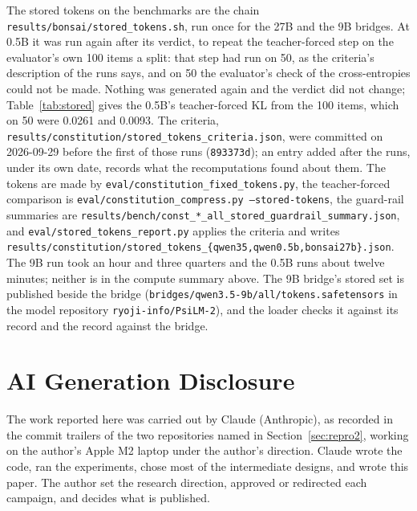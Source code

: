 \documentclass[11pt]{article}
\newcommand{\code}[1]{\texttt{#1}}
\begin{document}
\begin{sloppypar}
The stored tokens on the benchmarks are the chain
\code{results/\allowbreak{}bonsai/\allowbreak{}stored\_\allowbreak{}tokens.sh}, run once for the 27B
and the 9B bridges. At 0.5B it was run again after its verdict, to repeat the
teacher-forced step on the evaluator's own 100 items a split: that step had run on
50, as the criteria's description of the runs says, and on 50 the evaluator's
check of the cross-entropies could not be made. Nothing was generated again and
the verdict did not change; Table~\ref{tab:stored} gives the 0.5B's
teacher-forced KL from the 100 items, which on 50 were 0.0261 and 0.0093. The
criteria, \code{results/\allowbreak{}constitution/\allowbreak{}stored\_\allowbreak{}tokens\_\allowbreak{}criteria.json}, were
committed on 2026-09-29 before the first of those runs (\code{893373d}); an entry
added after the runs, under its own date, records what the recomputations found
about them. The tokens are made by \code{eval/\allowbreak{}constitution\_\allowbreak{}fixed\_\allowbreak{}tokens.py},
the teacher-forced comparison is
\code{eval/\allowbreak{}constitution\_\allowbreak{}compress.py --stored-tokens}, the guard-rail
summaries are \code{results/\allowbreak{}bench/\allowbreak{}const\_*\_all\_\allowbreak{}stored\_\allowbreak{}guardrail\_\allowbreak{}summary.json},
and \code{eval/\allowbreak{}stored\_\allowbreak{}tokens\_\allowbreak{}report.py} applies the criteria and writes
\code{results/\allowbreak{}constitution/\allowbreak{}stored\_\allowbreak{}tokens\_\allowbreak{}\{qwen35,\allowbreak{}qwen0.5b,\allowbreak{}bonsai27b\}.json}.
The 9B run took an hour and three quarters and the 0.5B runs about twelve
minutes; neither is in the compute summary above. The 9B bridge's stored set is
published beside the bridge (\code{bridges/\allowbreak{}qwen3.5-9b/\allowbreak{}all/\allowbreak{}tokens.safetensors}
in the model repository \code{ryoji-info/PsiLM-2}), and the loader checks it
against its record and the record against the bridge.
\end{sloppypar}

\section{AI Generation Disclosure}
\label{sec:disclosure2}

The work reported here was carried out by Claude (Anthropic), as recorded in the
commit trailers of the two repositories named in Section~\ref{sec:repro2},
working on the author's Apple M2 laptop under the author's direction. Claude wrote
the code, ran the experiments, chose most of the intermediate designs, and wrote
this paper. The author set the research direction, approved or redirected each
campaign, and decides what is published.
\end{document}
